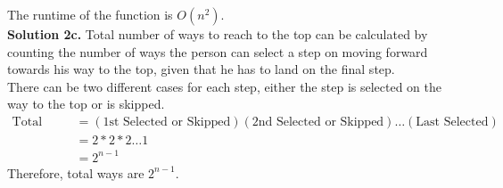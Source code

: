 \documentclass[11pt]{article}
\begin{document}
The runtime of the function is $O(n^2)$.\\
\linebreak
\textbf{Solution 2c.} Total number of ways to reach to the top can be calculated by counting the number of ways the person can select a step on moving forward towards his way to the top, given that he has to land on the final step. \\
\linebreak
There can be two different cases for each step, either the step is selected on the way to the top or is skipped. \\
\begin{align*}
\text{Total ways} & = (\text{1st Selected or Skipped}) (\text{2nd Selected or Skipped}) \dots (\text{Last Selected}) \\ 
&= 2 * 2 * 2 \dots 1 \\
& = 2^{n-1}
\end{align*}
Therefore, total ways are $2^{n-1}$.
\end{document}
